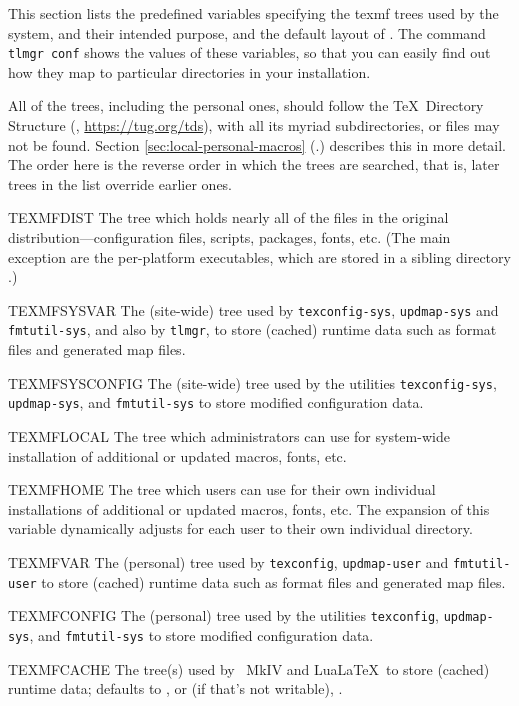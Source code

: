 \documentclass{article}
\begin{document}
This section lists the predefined variables specifying the texmf trees
used by the system, and their intended purpose, and the default layout
of \TL{}. The command \texttt{tlmgr~conf} shows the values of these
variables, so that you can easily find out how they map to particular
directories in your installation.

All of the trees, including the personal ones, should follow the \TeX\
Directory Structure (\TDS, \url{https://tug.org/tds}), with all its
myriad subdirectories, or files may not be found.  Section
\ref{sec:local-personal-macros} (\p.\pageref{sec:local-personal-macros})
describes this in more detail.  The order here is the reverse order in
which the trees are searched, that is, later trees in the list override
earlier ones.

\begin{ttdescription}
\item [TEXMFDIST] The tree which holds nearly all of the files in the original
  distribution---configuration files, scripts, packages, fonts, etc.
  (The main exception are the per-platform executables, which are stored
  in a sibling directory \code{bin/}.)
\item [TEXMFSYSVAR] The (site-wide) tree used by \verb+texconfig-sys+,
  \verb+updmap-sys+ and \verb+fmtutil-sys+, and also by \verb+tlmgr+, to
  store (cached) runtime data such as format files and generated map files.
\item [TEXMFSYSCONFIG] The (site-wide) tree used by the utilities
  \verb+texconfig-sys+, \verb+updmap-sys+, and \verb+fmtutil-sys+ to
  store modified configuration data.
\item [TEXMFLOCAL] The tree which administrators can use for system-wide
  installation of additional or updated macros, fonts, etc.
\item [TEXMFHOME] The tree which users can use for their own individual
  installations of additional or updated macros, fonts, etc.
  The expansion of this variable dynamically adjusts for each user to
  their own individual directory.
\item [TEXMFVAR] The (personal) tree used by \verb+texconfig+,
  \verb+updmap-user+ and \verb+fmtutil-user+ to store (cached) runtime data such
  as format files and generated map files.
\item [TEXMFCONFIG] The (personal) tree used by the utilities
  \verb+texconfig+, \verb+updmap-sys+, and \verb+fmtutil-sys+ to store modified
  configuration data.
\item [TEXMFCACHE] The tree(s) used by \ConTeXt\ MkIV and Lua\LaTeX\
  to store (cached) runtime data; defaults to ,
  or (if that's not writable), \code{TEXMFVAR}.
\end{ttdescription}
\end{document}

